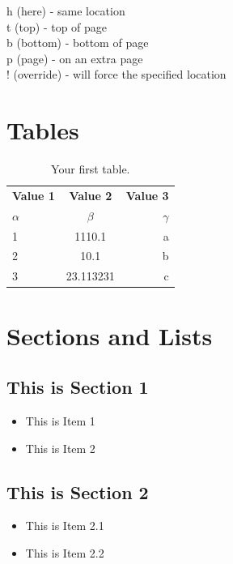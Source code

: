 \documentclass[12pt,fullpagea4paper,a4paper,doublespace]{article}
\begin{document}
h (here) - same location \\
t (top) - top of page\\ 
b (bottom) - bottom of page\\
p (page) - on an extra page\\
! (override) - will force the specified location\\
 \newpage
\section{Tables}

\begin{table}[h!]
  \begin{center}
    \caption{Your first table.}
    \label{tab:table1}
    \begin{tabular}{l|c|r} %
      \textbf{Value 1} & \textbf{Value 2} & \textbf{Value 3}\\
      $\alpha$ & $\beta$ & $\gamma$ \\
      \hline
      1 & 1110.1 & a\\
      2 & 10.1 & b\\
      3 & 23.113231 & c\\
    \end{tabular}
  \end{center}
\end{table}

\section{Sections and Lists}
 
\subsection{This is Section 1}
\begin{itemize}
    \item This is Item 1
    \item This is Item 2

\end{itemize}

\subsection{This is Section 2}
\begin{itemize}
    \item This is Item 2.1 
    \item This is Item 2.2 
\end{itemize}
 
\end{document}
